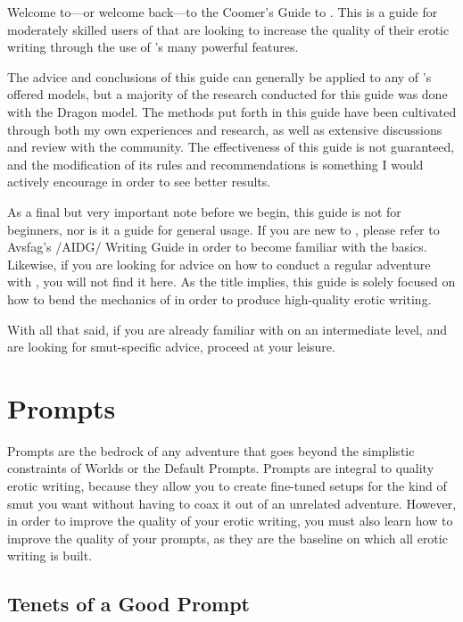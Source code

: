 ﻿\documentclass[Coomer-main.tex]{subfiles}
\begin{document}
\label{ch:preface}

 Welcome to—or welcome back—to the Coomer's Guide to \aid.
This is a guide for moderately skilled users of \aid that are looking to increase the quality of their erotic writing through the use of \aid's many powerful features.

The advice and conclusions of this guide can generally be applied to any of \aid's offered models, but a majority of the research conducted for this guide was done with the Dragon model.
The methods put forth in this guide have been cultivated through both my own experiences and research, as well as extensive discussions and review with the \aid community.
The effectiveness of this guide is not guaranteed, and the modification of its rules and recommendations is something I would actively encourage in order to see better results.

As a final but very important note before we begin, this guide is not for beginners, nor is it a guide for general usage.
If you are new to \aid, please refer to Avsfag's /AIDG/ Writing Guide in order to become familiar with the basics.
Likewise, if you are looking for advice on how to conduct a regular adventure with \aid, you will not find it here.
As the title implies, this guide is solely focused on how to bend the mechanics of \aid in order to produce high-quality erotic writing.

With all that said, if you are already familiar with \aid on an intermediate level, and are looking for smut-specific advice, proceed at your leisure.

\chapter{Prompts}
\label{ch:prompts}

Prompts are the bedrock of any \aid adventure that goes beyond the simplistic constraints of Worlds or the Default Prompts.
Prompts are integral to quality erotic writing, because they allow you to create fine-tuned setups for the kind of smut you want without having to coax it out of an unrelated adventure.
However, in order to improve the quality of your erotic writing, you must also learn how to improve the quality of your prompts, as they are the baseline on which all erotic writing is built.

\section{Tenets of a Good Prompt}
\label{sec:tenets}
\end{document}
